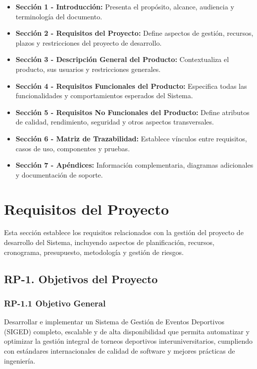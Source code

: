 \documentclass[12pt,a4paper]{article}
\begin{document}
\begin{itemize}[noitemsep]
    \item \textbf{Sección 1 - Introducción:} Presenta el propósito, alcance, audiencia y terminología del documento.
    \item \textbf{Sección 2 - Requisitos del Proyecto:} Define aspectos de gestión, recursos, plazos y restricciones del proyecto de desarrollo.
    \item \textbf{Sección 3 - Descripción General del Producto:} Contextualiza el producto, sus usuarios y restricciones generales.
    \item \textbf{Sección 4 - Requisitos Funcionales del Producto:} Especifica todas las funcionalidades y comportamientos esperados del Sistema.
    \item \textbf{Sección 5 - Requisitos No Funcionales del Producto:} Define atributos de calidad, rendimiento, seguridad y otros aspectos transversales.
    \item \textbf{Sección 6 - Matriz de Trazabilidad:} Establece vínculos entre requisitos, casos de uso, componentes y pruebas.
    \item \textbf{Sección 7 - Apéndices:} Información complementaria, diagramas adicionales y documentación de soporte.
\end{itemize}

\newpage

\section{Requisitos del Proyecto}

Esta sección establece los requisitos relacionados con la gestión del proyecto de desarrollo del Sistema, incluyendo aspectos de planificación, recursos, cronograma, presupuesto, metodología y gestión de riesgos.

\subsection{RP-1. Objetivos del Proyecto}

\subsubsection{RP-1.1 Objetivo General}

Desarrollar e implementar un Sistema de Gestión de Eventos Deportivos (SIGED) completo, escalable y de alta disponibilidad que permita automatizar y optimizar la gestión integral de torneos deportivos interuniversitarios, cumpliendo con estándares internacionales de calidad de software y mejores prácticas de ingeniería.
\end{document}
